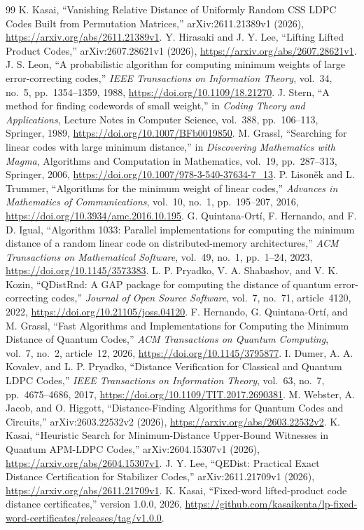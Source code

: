 \begin{thebibliography}{99}
K. Kasai, ``Vanishing Relative Distance of Uniformly
Random CSS LDPC Codes Built from Permutation Matrices,''
arXiv:2611.21389v1 (2026), \url{https://arxiv.org/abs/2611.21389v1}.
Y. Hirasaki and J. Y. Lee, ``Lifting Lifted Product Codes,''
arXiv:2607.28621v1 (2026),
\url{https://arxiv.org/abs/2607.28621v1}.
J. S. Leon, ``A probabilistic algorithm for computing minimum
weights of large error-correcting codes,'' \emph{IEEE Transactions on
Information Theory}, vol.~34, no.~5, pp.~1354--1359, 1988,
\url{https://doi.org/10.1109/18.21270}.
J. Stern, ``A method for finding codewords of small weight,''
in \emph{Coding Theory and Applications}, Lecture Notes in Computer Science,
vol.~388, pp.~106--113, Springer, 1989,
\url{https://doi.org/10.1007/BFb0019850}.
M. Grassl, ``Searching for linear codes with large minimum
distance,'' in \emph{Discovering Mathematics with Magma}, Algorithms and
Computation in Mathematics, vol.~19, pp.~287--313, Springer, 2006,
\url{https://doi.org/10.1007/978-3-540-37634-7_13}.
P. Lison\v{e}k and L. Trummer, ``Algorithms for the minimum
weight of linear codes,'' \emph{Advances in Mathematics of Communications},
vol.~10, no.~1, pp.~195--207, 2016,
\url{https://doi.org/10.3934/amc.2016.10.195}.
G. Quintana-Ort\'{i}, F. Hernando, and F. D. Igual,
``Algorithm 1033: Parallel implementations for computing the minimum
distance of a random linear code on distributed-memory architectures,''
\emph{ACM Transactions on Mathematical Software}, vol.~49, no.~1,
pp.~1--24, 2023, \url{https://doi.org/10.1145/3573383}.
L. P. Pryadko, V. A. Shabashov, and V. K. Kozin,
``QDistRnd: A GAP package for computing the distance of quantum
error-correcting codes,'' \emph{Journal of Open Source Software}, vol.~7,
no.~71, article~4120, 2022, \url{https://doi.org/10.21105/joss.04120}.
F. Hernando, G. Quintana-Ort\'{i}, and M. Grassl,
``Fast Algorithms and Implementations for Computing the Minimum Distance
of Quantum Codes,'' \emph{ACM Transactions on Quantum Computing}, vol.~7,
no.~2, article~12, 2026, \url{https://doi.org/10.1145/3795877}.
I. Dumer, A. A. Kovalev, and L. P. Pryadko,
``Distance Verification for Classical and Quantum LDPC Codes,''
\emph{IEEE Transactions on Information Theory}, vol.~63, no.~7,
pp.~4675--4686, 2017,
\url{https://doi.org/10.1109/TIT.2017.2690381}.
M. Webster, A. Jacob, and O. Higgott,
``Distance-Finding Algorithms for Quantum Codes and Circuits,''
arXiv:2603.22532v2 (2026), \url{https://arxiv.org/abs/2603.22532v2}.
K. Kasai, ``Heuristic Search for Minimum-Distance
Upper-Bound Witnesses in Quantum APM-LDPC Codes,'' arXiv:2604.15307v1 (2026),
\url{https://arxiv.org/abs/2604.15307v1}.
J. Y. Lee, ``QEDist: Practical Exact Distance Certification
for Stabilizer Codes,'' arXiv:2611.21709v1 (2026),
\url{https://arxiv.org/abs/2611.21709v1}.
K. Kasai, ``Fixed-word lifted-product code distance
certificates,'' version 1.0.0, 2026,
\url{https://github.com/kasaikenta/lp-fixed-word-certificates/releases/tag/v1.0.0}.
\end{thebibliography}
\endgroup
